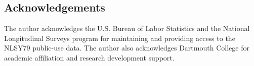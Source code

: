 \documentclass[12pt]{article}
\begin{document}
\subsection*{Acknowledgements}

The author acknowledges the U.S. Bureau of Labor Statistics and the National Longitudinal Surveys program for maintaining and providing access to the NLSY79 public-use data. The author also acknowledges Dartmouth College for academic affiliation and research development support.

\end{document}
